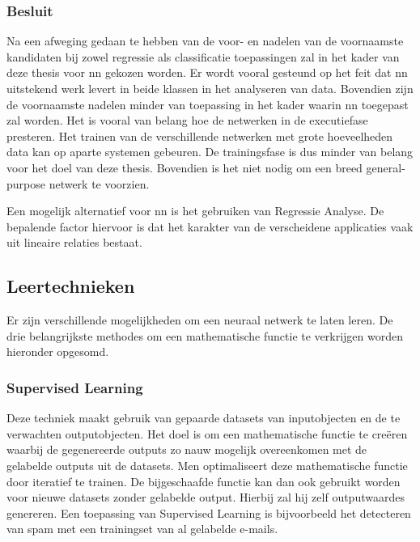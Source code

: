 	\subsubsection{Besluit}
	Na een afweging gedaan te hebben van de voor- en nadelen van de voornaamste kandidaten bij zowel regressie als classificatie toepassingen zal in het kader van deze thesis voor \gls{nn} gekozen worden. Er wordt vooral gesteund op het feit dat \gls{nn} uitstekend werk levert in beide klassen in het analyseren van data. Bovendien zijn de voornaamste nadelen minder van toepassing in het kader waarin \gls{nn} toegepast zal worden. Het is vooral van belang hoe de netwerken in de executiefase presteren. Het trainen van de verschillende netwerken met grote hoeveelheden data kan op aparte systemen gebeuren. De trainingsfase is dus minder van belang voor het doel van deze thesis. Bovendien is het niet nodig om een breed general-purpose netwerk te voorzien.
	
	Een mogelijk alternatief voor \gls{nn} is het gebruiken van Regressie Analyse. De bepalende factor hiervoor is dat het karakter van de verscheidene applicaties vaak uit lineaire relaties bestaat. 
		
		
		
		
\newpage
\subsection{Leertechnieken}
Er zijn verschillende mogelijkheden om een neuraal netwerk te laten leren. De drie belangrijkste methodes om een mathematische functie te verkrijgen worden hieronder opgesomd\cite{russell2016artificial}.


	\subsubsection{Supervised Learning} Deze techniek maakt gebruik van gepaarde datasets van inputobjecten en de te verwachten outputobjecten. Het doel is om een mathematische functie te cre\"eren waarbij de gegenereerde outputs zo nauw mogelijk overeenkomen met de gelabelde outputs uit de datasets. Men optimaliseert deze mathematische functie door iteratief te trainen. De bijgeschaafde functie kan dan ook gebruikt worden voor nieuwe datasets zonder gelabelde output. Hierbij zal hij zelf outputwaardes genereren. Een toepassing van Supervised Learning is bijvoorbeeld het detecteren van spam met een trainingset van al gelabelde e-mails.
	

